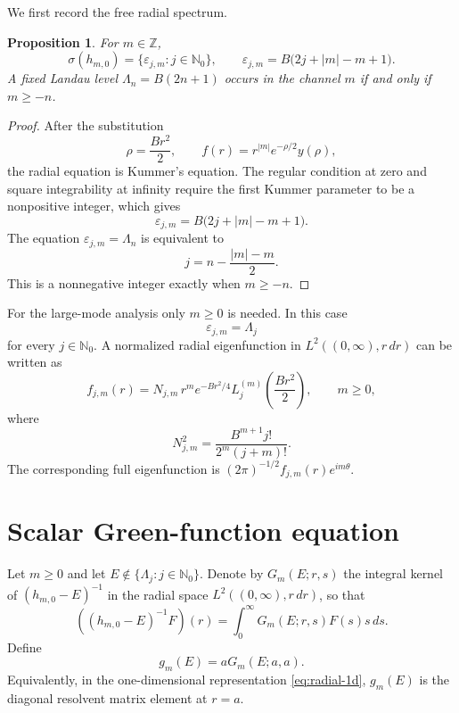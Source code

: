 \documentclass[12pt,a4paper]{article}
\numberwithin{equation}{section}
\newtheorem{prop}[thm]{Proposition}
\theoremstyle{remark}
\theoremstyle{definition}
\newcommand{\N}{\mathbb N}
\newcommand{\spec}{\sigma}
\begin{document}
We first record the free radial spectrum.

\begin{prop}\label{prop:radial-spectrum}
For $m\in\mathbb Z$,
$$
\spec(h_{m,0})
=\{\varepsilon_{j,m}:j\in\N_0\},
\qquad
\varepsilon_{j,m}
=B\bigl(2j+|m|-m+1\bigr).
$$
A fixed Landau level $\Lambda_n=B(2n+1)$ occurs in the channel $m$ if and only if
$m\ge -n$.
\end{prop}

\begin{proof}
After the substitution
$$
\rho=\frac{Br^2}{2},
\qquad
f(r)=r^{|m|}e^{-\rho/2}y(\rho),
$$
the radial equation is Kummer's equation. The regular condition at zero and square integrability at
infinity require the first Kummer parameter to be a nonpositive integer,
which gives
$$
\varepsilon_{j,m}
=B\bigl(2j+|m|-m+1\bigr).
$$
The equation $\varepsilon_{j,m}=\Lambda_n$ is equivalent to
$$
j=n-\frac{|m|-m}{2}.
$$
This is a nonnegative integer exactly when $m\ge -n$.
\end{proof}

For the large-mode analysis only $m\ge0$ is needed. In this case
$$
\varepsilon_{j,m}=\Lambda_j
$$
for every $j\in\N_0$. A normalized radial eigenfunction in
$L^2((0,\infty),r\,d r)$ can be written as
\begin{equation}\label{eq:radial-eigenfunction}
f_{j,m}(r)
=N_{j,m}\,r^m e^{-Br^2/4}
L_j^{(m)}\left(\frac{Br^2}{2}\right),
\qquad m\ge0,
\end{equation}
where
\begin{equation}\label{eq:Nnorm}
N_{j,m}^2
=\frac{B^{m+1}j!}{2^m(j+m)!}.
\end{equation}
The corresponding full eigenfunction is
$(2\pi)^{-1/2}f_{j,m}(r)e^{im\theta}$.

\section{Scalar Green-function equation}\label{sec:green}

Let $m\ge0$ and let $E\notin\{\Lambda_j:j\in\N_0\}$. Denote by
$G_m(E;r,s)$ the integral kernel of $(h_{m,0}-E)^{-1}$ in the radial space
$L^2((0,\infty),r\,d r)$, so that
$$
((h_{m,0}-E)^{-1}F)(r)
=\int_0^\infty G_m(E;r,s)F(s)s\,d s.
$$
Define
\begin{equation}\label{eq:gdef}
g_m(E)=aG_m(E;a,a).
\end{equation}
Equivalently, in the one-dimensional representation
\eqref{eq:radial-1d}, $g_m(E)$ is the diagonal resolvent matrix element at
$r=a$.
\end{document}
